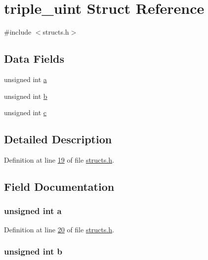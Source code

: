 \hypertarget{structtriple__uint}{}\section{triple\+\_\+uint Struct Reference}
\label{structtriple__uint}


{\ttfamily \#include $<$structs.\+h$>$}

\subsection*{Data Fields}
\begin{DoxyCompactItemize}
\item 
unsigned int \hyperlink{structtriple__uint_a0ea8a85723620c90be9fd2a693f12a59}{a}
\item 
unsigned int \hyperlink{structtriple__uint_a790d5baa17ec7aaf7bb49750a16e9c29}{b}
\item 
unsigned int \hyperlink{structtriple__uint_a6ce17b018c47d0f1d0e53a458f741ad3}{c}
\end{DoxyCompactItemize}


\subsection{Detailed Description}


Definition at line \hyperlink{structs_8h_source_l00019}{19} of file \hyperlink{structs_8h_source}{structs.\+h}.



\subsection{Field Documentation}
\subsubsection[{\texorpdfstring{a}{a}}]{\setlength{\rightskip}{0pt plus 5cm}unsigned int a}\hypertarget{structtriple__uint_a0ea8a85723620c90be9fd2a693f12a59}{}\label{structtriple__uint_a0ea8a85723620c90be9fd2a693f12a59}


Definition at line \hyperlink{structs_8h_source_l00020}{20} of file \hyperlink{structs_8h_source}{structs.\+h}.

\subsubsection[{\texorpdfstring{b}{b}}]{\setlength{\rightskip}{0pt plus 5cm}unsigned int b}\hypertarget{structtriple__uint_a790d5baa17ec7aaf7bb49750a16e9c29}{}\label{structtriple__uint_a790d5baa17ec7aaf7bb49750a16e9c29}


